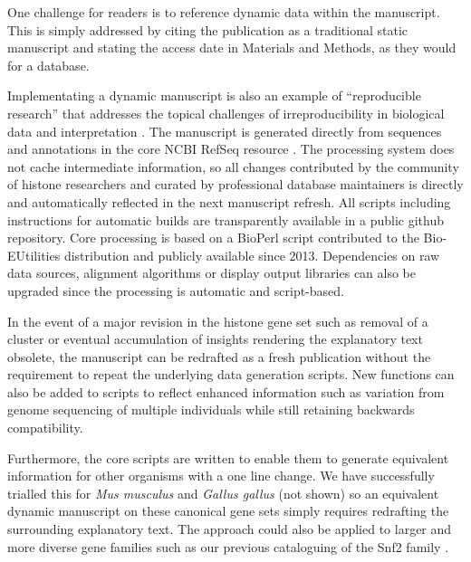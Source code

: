   One challenge for readers is to reference dynamic data within the manuscript. 
  This is simply addressed by citing the publication as a traditional static manuscript
  and stating the access date in Materials and Methods, as they would for a database.

  Implementating a dynamic manuscript is also an example of ``reproducible research'' 
  \citep{reproducible-research-bioinformatics,reproducible-research-law}
  that addresses the topical challenges of irreproducibility in biological data
  and interpretation \citep{ErrorProne2012,OpenPrograms2012}.
  The manuscript is generated directly from sequences and annotations
  in the core NCBI RefSeq resource \citep{PruittRefseq2014}.
  The processing system does not cache intermediate information, 
  so all changes contributed by the community of histone researchers 
  and curated by professional database maintainers
  is directly and automatically reflected in the next manuscript refresh.
  All scripts including instructions for automatic builds
  are transparently available in a public github repository.
  Core processing is based on a BioPerl script contributed to the Bio-EUtilities distribution
  and publicly available since 2013.
  Dependencies on raw data sources, alignment algorithms or display output libraries
  can also be upgraded since the processing is automatic and script-based.

  In the event of a major revision in the histone gene set such as removal of a cluster
  or eventual accumulation of insights rendering the explanatory text obsolete,
  the manuscript can be redrafted as a fresh publication
  without the requirement to repeat the underlying data generation scripts.
  New functions can also be added to scripts to reflect enhanced information
  such as variation from genome sequencing of multiple individuals
  while still retaining backwards compatibility.

  Furthermore, the core scripts are written to enable them to generate
  equivalent information for other organisms with a one line change.
  We have successfully trialled this for \textit{Mus musculus}
  and \textit{Gallus gallus} (not shown)
  so an equivalent dynamic manuscript on these canonical gene sets
  simply requires redrafting the surrounding explanatory text.
  The approach could also be applied to larger and more diverse gene families such as
  our previous cataloguing of the Snf2 family \citep{andrew-snf2-catalogue}.
